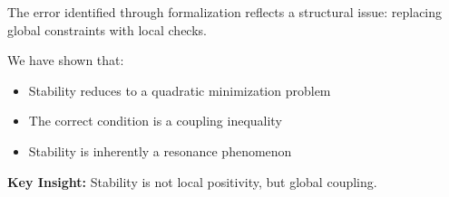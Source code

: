\documentclass[11pt,a4paper]{article}
\begin{document}
	The error identified through formalization reflects a structural issue: replacing global constraints with local checks.
	
	We have shown that:
	
	\begin{itemize}
		\item Stability reduces to a quadratic minimization problem
		\item The correct condition is a coupling inequality
		\item Stability is inherently a resonance phenomenon
	\end{itemize}
	
	\bigskip
	
	\noindent
	\textbf{Key Insight:} Stability is not local positivity, but global coupling.
	
\end{document}
